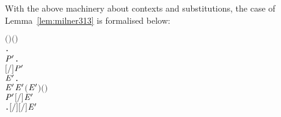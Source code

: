 With the above machinery about \multivariate contexts and substitutions,
the \multivariate case of Lemma~\ref{lem:milner313} is formalised
below:
\begin{alltt}
\HOLTokenTurnstile{}    \HOLSymConst{\HOLTokenConj{}}   \HOLSymConst{\HOLTokenSubset{}}   \HOLSymConst{\HOLTokenConj{}}  \ensuremath{(} \ensuremath{)} \ensuremath{(} \ensuremath{)} \HOLSymConst{\HOLTokenImp{}}
   \HOLSymConst{\HOLTokenForall{}}.
         \HOLSymConst{\ensuremath{=}}   \HOLSymConst{\HOLTokenImp{}}
       \HOLSymConst{\HOLTokenForall{}} \ensuremath{\HOLBoundVar{P}\sp{\prime}}.
           \ensuremath{[}\ensuremath{/}\ensuremath{]}  \HOLTokenTransBegin{}\HOLTokenTransEnd \ensuremath{\HOLBoundVar{P}\sp{\prime}} \HOLSymConst{\HOLTokenImp{}}
           \HOLSymConst{\HOLTokenExists{}}\ensuremath{\HOLBoundVar{E}\sp{\prime}}.
                 \ensuremath{\HOLBoundVar{E}\sp{\prime}} \HOLSymConst{\HOLTokenConj{}}  \ensuremath{\HOLBoundVar{E}\sp{\prime}} \HOLSymConst{\HOLTokenSubset{}}   \HOLSymConst{\HOLTokenConj{}}  \ensuremath{(} \ensuremath{\HOLBoundVar{E}\sp{\prime}}\ensuremath{)} \ensuremath{(} \ensuremath{)} \HOLSymConst{\HOLTokenConj{}}
               \ensuremath{\HOLBoundVar{P}\sp{\prime}} \HOLSymConst{\ensuremath{=}} \ensuremath{[}\ensuremath{/}\ensuremath{]} \ensuremath{\HOLBoundVar{E}\sp{\prime}} \HOLSymConst{\HOLTokenConj{}}
               \HOLSymConst{\HOLTokenForall{}}.   \HOLSymConst{\ensuremath{=}}   \HOLSymConst{\HOLTokenImp{}} \ensuremath{[}\ensuremath{/}\ensuremath{]}  \HOLTokenTransBegin{}\HOLTokenTransEnd \ensuremath{[}\ensuremath{/}\ensuremath{]} \ensuremath{\HOLBoundVar{E}\sp{\prime}}
\end{alltt}

